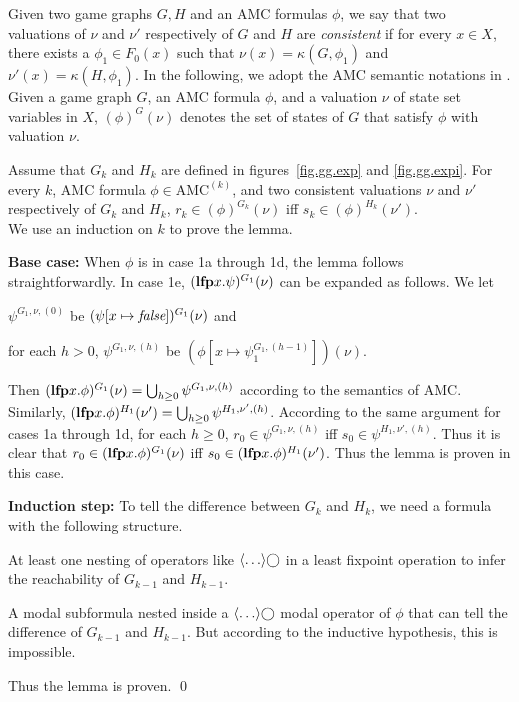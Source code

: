 Given two game graphs $G,H$ and
an AMC formulas $\phi$,
we say that
two valuations of $\nu$ and $\nu'$ respectively of $G$ and $H$
are {\em consistent} if for every $x\in X$,
there exists a $\phi_1\in F_0(x)$ such that
$\nu(x)=\kappa(G,\phi_1)$ and $\nu'(x)=\kappa(H,\phi_1)$.
In the following, we adopt the AMC semantic notations in \cite{AHK02}.
Given a game graph $G$, an AMC formula $\phi$,
and a valuation $\nu$ of state set variables in $X$,
$(\phi)^G(\nu)$ denotes the set of states of $G$ that
satisfy $\phi$ with valuation $\nu$.







{\lemma\label{lemma.amc.induction}
Assume that $G_k$ and $H_k$ are defined in
figures~\ref{fig.gg.exp} and \ref{fig.gg.expi}.
For every $k$, AMC formula $\phi\in \mbox{AMC}^{(k)}$, and two consistent
valuations $\nu$ and $\nu'$ respectively of $G_k$ and $H_k$,
$r_k\in (\phi)^{G_k}(\nu)$ iff
$s_k\in (\phi)^{H_k}(\nu')$.
}
\\\pf
We use an induction on $k$ to prove the lemma.

\noindent
{\bf Base case:} 
When $\phi$ is in case 1a through 1d, the lemma follows straightforwardly.
In case 1e,
$(\mbox{\bf lfp} x.\psi)^{G_1}(\nu)$ can be expanded as follows.
We let
\begin{list1}
\item $\psi^{G_1,\nu,(0)}$ be $(\psi[x\mapsto \mbox{\em false}])^{G_1}(\nu)$ and
\item for each $h>0$,
    $\psi^{G_1,\nu,(h)}$ be $(\phi[x\mapsto \psi_1^{G_1,(h-1)}])(\nu)$.
\end{list1}
Then $(\mbox{\bf lfp} x.\phi)^{G_1}(\nu)=\bigcup_{h\geq 0}\psi^{G_1,\nu,(h)}$
according to the semantics of AMC.
Similarly, \linebreak 
$(\mbox{\bf lfp} x.\phi)^{H_1}(\nu')=\bigcup_{h\geq 0}\psi^{H_1,\nu',(h)}$.
According to the same argument for cases 1a through 1d,
for each $h\geq 0$,
$r_0\in \psi^{G_1,\nu,(h)}$ iff
$s_0\in \psi^{H_1,\nu',(h)}$.
Thus it is clear that
$r_0\in (\mbox{\bf lfp} x.\phi)^{G_1}(\nu)$ iff
$s_0\in (\mbox{\bf lfp} x.\phi)^{H_1}(\nu')$.
Thus the lemma is proven in this case.

\noindent
{\bf Induction step:}
To tell the difference between $G_k$ and $H_k$,
we need a formula with the following structure.
\begin{list1}
\item At least one nesting of operators
    like $\langle\ldots\rangle\bigcirc$ in a least fixpoint operation 
    to infer the reachability of $G_{k-1}$ and $H_{k-1}$.
\item A modal subformula nested inside a $\langle \ldots\rangle \bigcirc$
    modal operator of $\phi$ that can tell the difference
    of $G_{k-1}$ and $H_{k-1}$.  
    But according to the inductive hypothesis, this is impossible.  
\end{list1}
Thus the lemma is proven.
\qed


